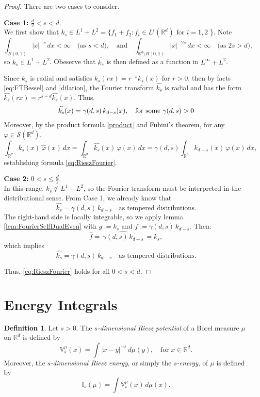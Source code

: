 \documentclass[12pt,a4paper]{report}
\theoremstyle{definition}
\newtheorem{definition}{Definition}
\begin{document}
\begin{proof}
There are two cases to consider.

\textbf{Case 1:} \( \frac{d}{2} < s < d \). \\
We first show that \( k_s \in L^1 + L^2 = \{ f_1 + f_2 : f_i \in L^i(\mathbb{R}^d) \text{ for } i = 1, 2\) \}. Note
\[
\int_{B(0,1)} |x|^{-s} \, dx < \infty \quad \text{(as } s < d \text{)},
\quad \text{and} \quad
\int_{\mathbb{R}^d \setminus B(0,1)} |x|^{-2s} \, dx < \infty \quad \text{(as } 2s > d \text{)},
\]
so \( k_s \in L^1 + L^2 \). Obeserve that \( \widehat{k_s} \) is then defined as a function in \( L^\infty + L^2 \).

Since \( k_s \) is radial and satisfies \( k_s(rx) = r^{-s} k_s(x) \) for $r>0$, then by facts \ref{eq:FTBessel} and \ref{dilation}, the Fourier transform \( \widehat{k_s} \) is radial and has the form $\widehat{k_s}(rx) = r^{s-d} \widehat{k_s}(x)$. Thus,
\[
\widehat{k_s}(x) = \gamma(d,s) \, k_{d-s}(x), \text{\quad for some } \gamma(d,s) > 0
\]
Moreover, by the product formula \ref{product} and Fubini's theorem, for any \( \varphi \in \mathcal{S}(\mathbb{R}^d) \),
\[
\int_{\mathbb{R}^d} k_s(x) \, \widehat{\varphi}(x) \, dx
= \int_{\mathbb{R}^d} \widehat{k_s}(x) \, \varphi(x) \, dx
= \gamma(d,s) \int_{\mathbb{R}^d} k_{d-s}(x) \, \varphi(x) \, dx,
\]
establishing formula \eqref{eq:RieszFourier}.

\textbf{Case 2:} \( 0 < s \leq \frac{d}{2} \). \\
In this range, \( k_s \notin L^1 + L^2 \), so the Fourier transform must be interpreted in the distributional sense. From Case 1, we already know that
\[
\widehat{k_s} = \gamma(d,s) \, k_{d-s}
\quad \text{as tempered distributions}.
\]
The right-hand side is locally integrable, so we apply lemma \ref{lem:FourierSelfDualEven} with \( g := k_s \) and \( f := \gamma(d,s) \, k_{d-s} \). Then:
\[
\widehat{f} = \widehat{\,\gamma(d,s) \, k_{d-s}\,} = k_s,
\]
which implies
\[
\widehat{k_s} = \gamma(d,s) \, k_{d-s}
\quad \text{as tempered distributions}.
\]

Thus, \eqref{eq:RieszFourier} holds for all \( 0 < s < d \).
\end{proof}



\section{Energy Integrals}
\begin{definition}
Let $s>0$. The \textit{\( s\)-dimensional Riesz potential}  of a Borel measure \( \mu \) on $\mathbb{R}^d$ is defined by
\[
\mathbb{V}^\mu_s(x) = \int |x - y|^{-s} \, d\mu(y), \quad \text{for } x \in \mathbb{R}^d.
\] Moreover, the \textit{\( s\)-dimensional Riesz energy}, or simply the \textit{\( s\)-energy}, of \( \mu \) is defined by
\[
\mathbb{I}_s(\mu) = \int \mathbb{V}^\mu_s(x) \, d\mu(x).
\]
\end{definition}
\end{document}
